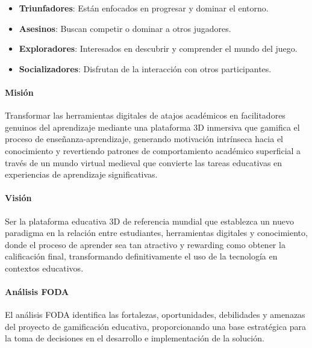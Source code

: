 \begin{itemize}
\item \textbf{Triunfadores}: Están enfocados en progresar y dominar el entorno.
\item \textbf{Asesinos}: Buscan competir o dominar a otros jugadores.
\item \textbf{Exploradores}: Interesados en descubrir y comprender el mundo del juego.
\item \textbf{Socializadores}: Disfrutan de la interacción con otros participantes.
\end{itemize}

\paragraph{Misión}
Transformar las herramientas digitales de atajos académicos en facilitadores genuinos del aprendizaje mediante una plataforma 3D inmersiva que gamifica el proceso de enseñanza-aprendizaje, generando motivación intrínseca hacia el conocimiento y revertiendo patrones de comportamiento académico superficial a través de un mundo virtual medieval que convierte las tareas educativas en experiencias de aprendizaje significativas.

\paragraph{Visión}
Ser la plataforma educativa 3D de referencia mundial que establezca un nuevo paradigma en la relación entre estudiantes, herramientas digitales y conocimiento, donde el proceso de aprender sea tan atractivo y rewarding como obtener la calificación final, transformando definitivamente el uso de la tecnología en contextos educativos.

\paragraph{Análisis FODA}
El análisis FODA identifica las fortalezas, oportunidades, debilidades y amenazas del proyecto de gamificación educativa, proporcionando una base estratégica para la toma de decisiones en el desarrollo e implementación de la solución.


